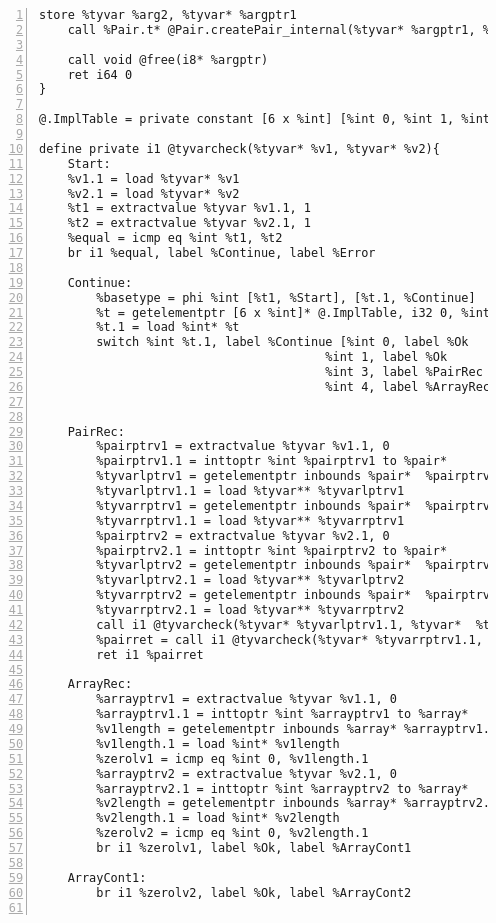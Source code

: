 \begin{lstlisting}[frame=single,numbers=left, language={[x86masm]Assembler}, caption={[Pair Structure: LLVM]Translation of the Pair structure.},
label=llvm:polymorphic]
	store %tyvar %arg2, %tyvar* %argptr1
	call %Pair.t* @Pair.createPair_internal(%tyvar* %argptr1, %tyvar* %argptr1)

	call void @free(i8* %argptr)
	ret i64 0
}

@.ImplTable = private constant [6 x %int] [%int 0, %int 1, %int 2, %int 3, %int 4, %int 2]

define private i1 @tyvarcheck(%tyvar* %v1, %tyvar* %v2){
	Start:
	%v1.1 = load %tyvar* %v1
	%v2.1 = load %tyvar* %v2
	%t1 = extractvalue %tyvar %v1.1, 1
	%t2 = extractvalue %tyvar %v2.1, 1
	%equal = icmp eq %int %t1, %t2
	br i1 %equal, label %Continue, label %Error

	Continue:
		%basetype = phi %int [%t1, %Start], [%t.1, %Continue]
		%t = getelementptr [6 x %int]* @.ImplTable, i32 0, %int %basetype
		%t.1 = load %int* %t
		switch %int %t.1, label %Continue [%int 0, label %Ok
										%int 1, label %Ok
									 	%int 3, label %PairRec
									 	%int 4, label %ArrayRec]


	PairRec:
		%pairptrv1 = extractvalue %tyvar %v1.1, 0
		%pairptrv1.1 = inttoptr %int %pairptrv1 to %pair*
		%tyvarlptrv1 = getelementptr inbounds %pair*  %pairptrv1.1, i32 0, i32 0
		%tyvarlptrv1.1 = load %tyvar** %tyvarlptrv1
		%tyvarrptrv1 = getelementptr inbounds %pair*  %pairptrv1.1, i32 0, i32 0
		%tyvarrptrv1.1 = load %tyvar** %tyvarrptrv1
		%pairptrv2 = extractvalue %tyvar %v2.1, 0
		%pairptrv2.1 = inttoptr %int %pairptrv2 to %pair*
		%tyvarlptrv2 = getelementptr inbounds %pair*  %pairptrv2.1, i32 0, i32 0
		%tyvarlptrv2.1 = load %tyvar** %tyvarlptrv2
		%tyvarrptrv2 = getelementptr inbounds %pair*  %pairptrv2.1, i32 0, i32 0
		%tyvarrptrv2.1 = load %tyvar** %tyvarrptrv2
		call i1 @tyvarcheck(%tyvar* %tyvarlptrv1.1, %tyvar*  %tyvarlptrv2.1)
		%pairret = call i1 @tyvarcheck(%tyvar* %tyvarrptrv1.1, %tyvar*  %tyvarrptrv2.1)
		ret i1 %pairret

	ArrayRec:
		%arrayptrv1 = extractvalue %tyvar %v1.1, 0
		%arrayptrv1.1 = inttoptr %int %arrayptrv1 to %array*
		%v1length = getelementptr inbounds %array* %arrayptrv1.1, i32 0, i32 0
		%v1length.1 = load %int* %v1length
		%zerolv1 = icmp eq %int 0, %v1length.1
		%arrayptrv2 = extractvalue %tyvar %v2.1, 0
		%arrayptrv2.1 = inttoptr %int %arrayptrv2 to %array*
		%v2length = getelementptr inbounds %array* %arrayptrv2.1, i32 0, i32 0
		%v2length.1 = load %int* %v2length
		%zerolv2 = icmp eq %int 0, %v2length.1
		br i1 %zerolv1, label %Ok, label %ArrayCont1

	ArrayCont1:
		br i1 %zerolv2, label %Ok, label %ArrayCont2


\end{lstlisting}
